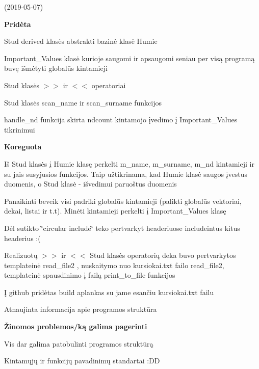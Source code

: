 (2019-\/05-\/07)

 {\bfseries{Pridėta}}
\begin{DoxyItemize}
\item {\ttfamily Stud} derived klasės abstrakti bazinė klasė {\ttfamily Humie}
\item {\ttfamily Important\+\_\+\+Values} klasė kurioje saugomi ir apsaugomi seniau per visą programą buvę išmėtyti globalūs kintamieji
\item {\ttfamily Stud} klasės $>$$>$ ir $<$$<$ operatoriai
\item {\ttfamily Stud} klasės {\ttfamily scan\+\_\+name} ir {\ttfamily scan\+\_\+surname} funkcijos
\item {\ttfamily handle\+\_\+nd} funkcija skirta {\ttfamily ndcount} kintamojo įvedimo į {\ttfamily Important\+\_\+\+Values} tikrinimui
\end{DoxyItemize}

{\bfseries{Koreguota}}
\begin{DoxyItemize}
\item Iš {\ttfamily Stud} klasės į {\ttfamily Humie} klasę perkelti {\ttfamily m\+\_\+name, m\+\_\+surname, m\+\_\+nd} kintamieji ir su jais susyjusios funkcijos. Taip užtikrinama, kad {\ttfamily Humie} klasė saugos įvestus duomenis, o {\ttfamily Stud} klasė -\/ išvedimui paruoštus duomenis
\item Panaikinti beveik visi padriki globalūs kintamieji (palikti globalūs vektoriai, dekai, listai ir t.\+t). Minėti kintamieji perkelti į {\ttfamily Important\+\_\+\+Values} klasę
\item Dėl sutikto \char`\"{}circular include\char`\"{} teko pertvarkyt headeriuose include\textquotesingle{}intus kitus headerius \+:(
\item Realizuotų $>$$>$ ir $<$$<$ {\ttfamily Stud} klasės operatorių deka buvo pertvarkytos template\textquotesingle{}inė {\ttfamily read\+\_\+file2} , nuskaitymo nuo {\ttfamily kursiokai.\+txt} failo {\ttfamily read\+\_\+file2}, template\textquotesingle{}inė spausdinimo į failą {\ttfamily print\+\_\+to\+\_\+file} funkcijos
\item Į github pridėtas {\ttfamily build} aplankas su jame esančiu kursiokai.\+txt failu
\item Atnaujinta informacija apie programos struktūra
\end{DoxyItemize}

{\bfseries{Žinomos problemos/ką galima pagerinti}}
\begin{DoxyItemize}
\item Vis dar galima patobulinti programos struktūrą
\item Kintamųjų ir funkcijų pavadinimų standartai \+:DD
\end{DoxyItemize}



